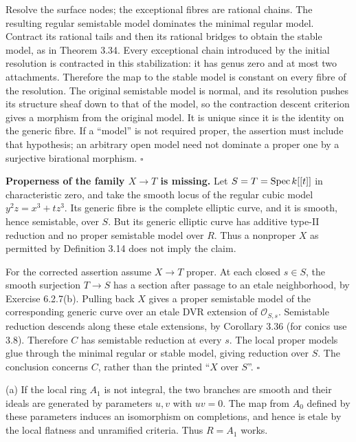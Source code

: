\documentclass[11pt]{article}
\let\chapterexercise\exercise
\renewcommand{\exercise}[2]{\Needspace{8\baselineskip}\chapterexercise{#1}{#2}}
\begin{document}
\pf Resolve the surface nodes; the exceptional fibres are rational chains. The resulting regular semistable model dominates the minimal regular model. Contract its rational tails and then its rational bridges to obtain the stable model, as in Theorem 3.34. Every exceptional chain introduced by the initial resolution is contracted in this stabilization: it has genus zero and at most two attachments. Therefore the map to the stable model is constant on every fibre of the resolution. The original semistable model is normal, and its resolution pushes its structure sheaf down to that of the model, so the contraction descent criterion gives a morphism from the original model. It is unique since it is the identity on the generic fibre. If a ``model'' is not required proper, the assertion must include that hypothesis; an arbitrary open model need not dominate a proper one by a surjective birational morphism. \hfill$\square$

\pf \textbf{Properness of the family $X\to T$ is missing.} Let $S=T=\operatorname{Spec} k[[t]]$ in characteristic zero, and take the smooth locus of the regular cubic model $y^2z=x^3+tz^3$. Its generic fibre is the complete elliptic curve, and it is smooth, hence semistable, over $S$. But its generic elliptic curve has additive type-II reduction and no proper semistable model over $R$. Thus a nonproper $X$ as permitted by Definition 3.14 does not imply the claim.

For the corrected assertion assume $X\to T$ proper. At each closed $s\in S$, the smooth surjection $T\to S$ has a section after passage to an etale neighborhood, by Exercise 6.2.7(b). Pulling back $X$ gives a proper semistable model of the corresponding generic curve over an etale DVR extension of $\mathcal O_{S,s}$. Semistable reduction descends along these etale extensions, by Corollary 3.36 (for conics use 3.8). Therefore $C$ has semistable reduction at every $s$. The local proper models glue through the minimal regular or stable model, giving reduction over $S$. The conclusion concerns $C$, rather than the printed ``$X$ over $S$''. \hfill$\square$

\pf (a) If the local ring $A_1$ is not integral, the two branches are smooth and their ideals are generated by parameters $u,v$ with $uv=0$. The map from $A_0$ defined by these parameters induces an isomorphism on completions, and hence is etale by the local flatness and unramified criteria. Thus $R=A_1$ works.
\end{document}
